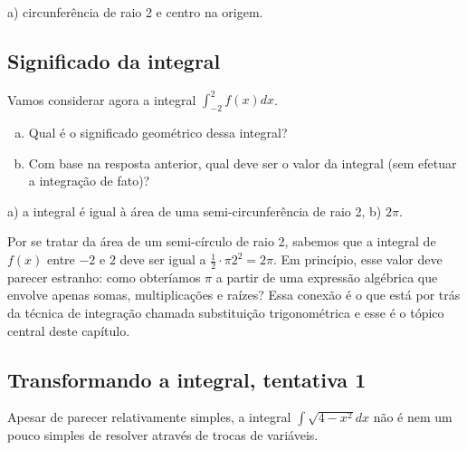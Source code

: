 \documentclass[main_estudante.tex]{subfiles}
\begin{document}
\begin{gabarito}
	\begin{gabaritoQuestao}
		a) circunferência de raio 2 e centro na origem.
	\end{gabaritoQuestao}
\end{gabarito}

\subsection*{Significado da integral}


\begin{questao}
Vamos considerar agora a integral $\int_{-2}^{2} f(x)dx$.
\begin{enumerate}[a)]
\item Qual é o significado geométrico dessa integral?
\item Com base na resposta anterior, qual deve ser o valor da integral (sem efetuar a integração de fato)?
\end{enumerate}
\end{questao}

\begin{gabarito}
	\begin{gabaritoQuestao}
		a) a integral é igual à área de uma semi-circunferência de raio 2, b) $2\pi$.
	\end{gabaritoQuestao}
\end{gabarito}

Por se tratar da área de um semi-círculo de raio 2, sabemos que a integral de $f(x)$ entre $-2$ e $2$ deve ser igual a $\frac{1}{2} \cdot \pi 2^2 = 2\pi$. Em princípio, esse valor deve parecer estranho: como obteríamos $\pi$ a partir de uma expressão algébrica que envolve apenas somas, multiplicações e raízes? Essa conexão é o que está por trás da técnica de integração chamada substituição trigonométrica e esse é o tópico central deste capítulo.

\subsection*{Transformando a integral, tentativa 1}

Apesar de parecer relativamente simples, a integral $\int \sqrt{4-x^2}dx$ não é nem um pouco simples de resolver através de trocas de variáveis.
\end{document}

